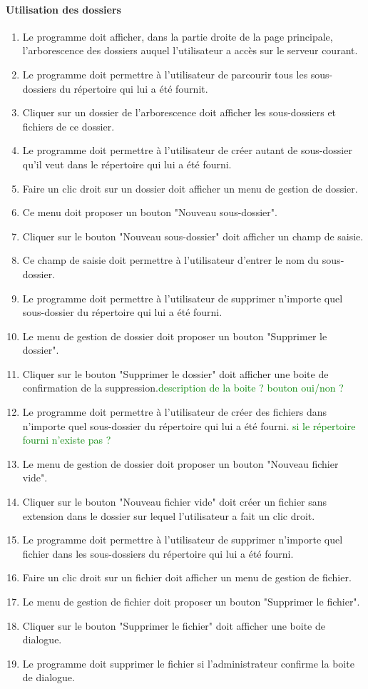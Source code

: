 \documentclass[10pt,a4paper]{report}
\begin{document}
\paragraph{Utilisation des dossiers}
	\begin{enumerate}
		\item Le programme doit afficher, dans la partie droite de la page principale, l'arborescence des dossiers auquel l'utilisateur a accès sur le serveur courant.
		\item Le programme doit permettre à l'utilisateur de parcourir tous les sous-dossiers du répertoire qui lui a été fournit.
		\item Cliquer sur un dossier de l'arborescence doit afficher les sous-dossiers et fichiers de ce dossier.
		\item Le programme doit permettre à l'utilisateur de créer autant de sous-dossier qu'il veut dans le répertoire qui lui a été fourni.
		\item Faire un clic droit sur un dossier doit afficher un menu de gestion de dossier.
		\item Ce menu doit proposer un bouton "Nouveau sous-dossier".
		\item Cliquer sur le bouton "Nouveau sous-dossier" doit afficher un champ de saisie.
		\item Ce champ de saisie doit permettre à l'utilisateur d'entrer le nom du sous-dossier.
		\item Le programme doit permettre à l'utilisateur de supprimer n'importe quel sous-dossier du répertoire qui lui a été fourni.
		\item Le menu de gestion de dossier doit proposer un bouton "Supprimer le dossier".
		\item Cliquer sur le bouton "Supprimer le dossier" doit afficher une boite de confirmation de la suppression.\textcolor{green}{description de la boite ? bouton oui/non ?}
		\item Le programme doit permettre à l'utilisateur de créer des fichiers dans n'importe quel sous-dossier du répertoire qui lui a été fourni.\textcolor{green}{ si le répertoire fourni n'existe pas ?}
		\item Le menu de gestion de dossier doit proposer un bouton "Nouveau fichier vide".
		\item Cliquer sur le bouton "Nouveau fichier vide" doit créer un fichier sans extension dans le dossier sur lequel l'utilisateur a fait un clic droit.
		\item Le programme doit permettre à l'utilisateur de supprimer n'importe quel fichier dans les sous-dossiers du répertoire qui lui a été fourni.
		\item Faire un clic droit sur un fichier doit afficher un menu de gestion de fichier.
		\item Le menu de gestion de fichier doit proposer un bouton "Supprimer le fichier".
		\item Cliquer sur le bouton "Supprimer le fichier" doit afficher une boite de dialogue.
		\item Le programme doit supprimer le fichier si l'administrateur confirme la boite de dialogue.
	\end{enumerate}
	
\end{document}
